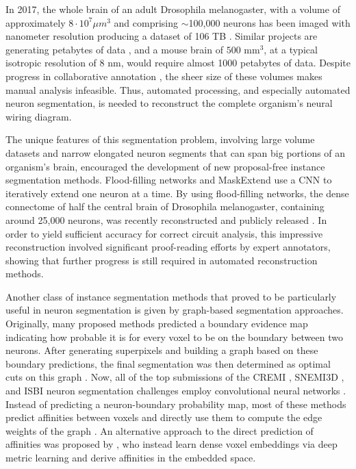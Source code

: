 In 2017, the whole brain of an adult Drosophila melanogaster, with a volume of approximately $8\cdot 10^7 \mu m^3$ and comprising $\sim$100,000 neurons has been imaged with nanometer resolution producing a dataset of 106 TB \cite{zheng2018complete}. Similar projects are generating petabytes of data \cite{yin2020petascale}, and a mouse brain of $500$ mm$^3$, at a typical isotropic resolution of 8 nm, would require almost 1000 petabytes of data.
Despite progress in collaborative annotation \cite{kim2014space}, the sheer size of these volumes makes manual analysis infeasible. Thus, automated processing, and especially automated neuron segmentation, is needed to reconstruct the complete organism's neural wiring diagram.

The unique features of this segmentation problem, involving large volume datasets and narrow elongated neuron segments that can span big portions of an organism's brain, encouraged the development of new proposal-free instance segmentation methods.
Flood-filling networks \cite{januszewski2018high} and MaskExtend \cite{meirovitch2016multi} use a CNN to iteratively extend one neuron at a time. By using flood-filling networks, the dense connectome of half the central brain of Drosophila melanogaster, containing around 25,000 neurons, was recently reconstructed and publicly released \cite{xu2020connectome}. In order to yield sufficient accuracy for correct circuit analysis, this impressive reconstruction involved significant proof-reading efforts by expert annotators, showing that further progress is still required in automated reconstruction methods.

Another class of instance segmentation methods that proved to be particularly useful in neuron segmentation is given by graph-based segmentation approaches. 
Originally, many proposed methods predicted a boundary evidence map indicating how probable it is for every voxel to be on the boundary between two neurons. After generating superpixels and building a graph based on these boundary predictions, the final segmentation was then determined as optimal cuts on this graph \cite{andres20123d,andres2012globally,beier2017multicut,funke2018large,meirovitch2019cross,turaga2010convolutional}. Now, all of the top submissions of the CREMI \cite{cremi}, SNEMI3D \cite{SNEMI3D}, and ISBI neuron segmentation challenges employ convolutional neural networks \cite{lee2017superhuman,hirsch2020patchperpix,bailoni2019generalized}. Instead of predicting a neuron-boundary probability map, most of these methods predict affinities between voxels and directly use them to compute the edge weights of the graph \cite{lee2017superhuman,pape2017solving,hirsch2020patchperpix,pape2019leveraging,wolf2018mutex}. An alternative approach to the direct prediction of affinities was proposed by \cite{lee2019learning}, who instead learn dense voxel embeddings via deep metric learning and derive affinities in the embedded space. 

